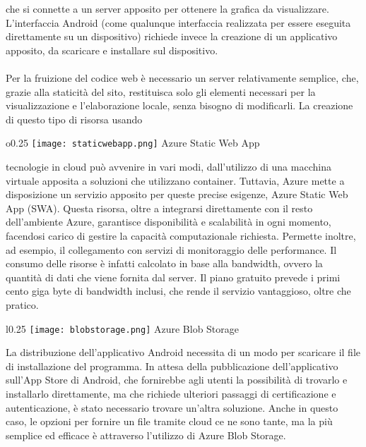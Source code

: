 che si connette a un server apposito
per ottenere la grafica da visualizzare.
L'interfaccia Android 
(come qualunque interfaccia realizzata per essere eseguita direttamente su un dispositivo)
richiede invece la creazione di un applicativo apposito,
da scaricare e installare sul dispositivo.\\
\\
Per la fruizione del codice web è necessario un server relativamente semplice,
che, grazie alla staticità del sito,
restituisca solo gli elementi necessari per la visualizzazione e l'elaborazione locale,
senza bisogno di modificarli.
La creazione di questo tipo di risorsa usando
\begin{wrapfigure}{o}{0.25\textwidth}
    \centering
    \texttt{[image: staticwebapp.png]}
    Azure Static Web App
\end{wrapfigure}
tecnologie in cloud può avvenire in vari modi,
dall'utilizzo di una macchina virtuale apposita
a soluzioni che utilizzano container.
Tuttavia, Azure mette a disposizione un servizio apposito per queste precise esigenze,
Azure Static Web App (SWA).\newline
Questa risorsa, 
oltre a integrarsi direttamente con il resto dell'ambiente Azure,
garantisce disponibilità e scalabilità in ogni momento,
facendosi carico di gestire la capacità computazionale richiesta.
Permette inoltre, ad esempio, 
il collegamento con servizi di monitoraggio delle performance.
Il consumo delle risorse è infatti calcolato in base alla bandwidth,
ovvero la quantità di dati che viene fornita dal server.
Il piano gratuito prevede i primi cento giga byte di bandwidth inclusi,
che rende il servizio vantaggioso, oltre che pratico.\newline
\par
\begin{wrapfigure}{l}{0.25\textwidth}
    \centering
    \texttt{[image: blobstorage.png]}
    Azure Blob Storage
\end{wrapfigure}
La distribuzione dell'applicativo Android
necessita di un modo per scaricare il file di installazione del programma.
In attesa della pubblicazione dell'applicativo sull'App Store di Android,
che fornirebbe agli utenti la possibilità di trovarlo e installarlo direttamente,
ma che richiede ulteriori passaggi di certificazione e autenticazione,
è stato necessario trovare un'altra soluzione.
Anche in questo caso,
le opzioni per fornire un file tramite cloud ce ne sono tante,
ma la più semplice ed efficace è attraverso l'utilizzo di Azure Blob Storage.\\
